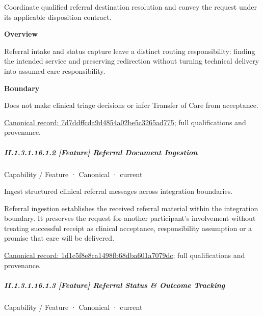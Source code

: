 Coordinate qualified referral destination resolution and convey the request under its applicable disposition contract.



\textbf{Overview}



Referral intake and status capture leave a distinct routing responsibility: finding the intended service and preserving redirection without turning technical delivery into assumed care responsibility.



\textbf{Boundary}



Does not make clinical triage decisions or infer Transfer of Care from acceptance.


{\footnotesize \href{../../../../continuum/strategy/capability/feature/7d7ddffcda9d4854a02be5c3265ad775.md}{Canonical record: 7d7ddffcda9d4854a02be5c3265ad775}; full qualifications and provenance.}\par
\subparagraph*{II.1.3.1.16.1.2 [Feature] Referral Document Ingestion}
\label{navigation:II.1.3.1.16.1.2}

\label{element:1d1c5f8e8ca1498fb68dba601a7079dc}
{\small Capability / Feature · Canonical · current}\par

Ingest structured clinical referral messages across integration boundaries.



Referral ingestion establishes the received referral material within the integration boundary. It preserves the request for another participant's involvement without treating successful receipt as clinical acceptance, responsibility assumption or a promise that care will be delivered.


{\footnotesize \href{../../../../continuum/strategy/capability/feature/1d1c5f8e8ca1498fb68dba601a7079dc.md}{Canonical record: 1d1c5f8e8ca1498fb68dba601a7079dc}; full qualifications and provenance.}\par
\subparagraph*{II.1.3.1.16.1.3 [Feature] Referral Status \& Outcome Tracking}
\label{navigation:II.1.3.1.16.1.3}

\label{element:836fa704f7b24bfc8f7eeb72a36bb897}
{\small Capability / Feature · Canonical · current}\par


